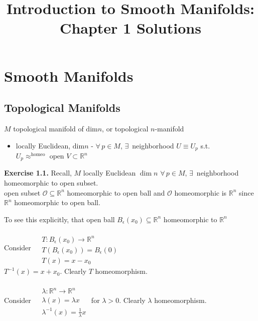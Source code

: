 \documentclass[11pt]{amsart}
\title{Introduction to Smooth Manifolds: Chapter 1 Solutions}
\theoremstyle{definition}
\newcommand{\exercisehead}[1]{\medskip\noindent\textbf{Exercise #1.} }
\begin{document}
\maketitle
\section{Smooth Manifolds}







\subsection*{Topological Manifolds }

$M$ topological manifold of $\text{dim}{n}$, or topological $n$-manifold
\begin{itemize}
\item locally Euclidean, $\text{dim}{n}$ - $\forall \, p \in M$, $\exists \, $ neighborhood $U \equiv U_p$ s.t. $U_p \approx^{\text{homeo}} \text{ open } V \subset \mathbb{R}^n$
\end{itemize}


\exercisehead{1.1} Recall, $M$ locally Euclidean $\dim{n}$ $\forall \, p \in M$, $\exists \,$ neighborhood homeomorphic to open subset. \\
open subset $\mathcal{O} \subseteq \mathbb{R}^n$ homeomorphic to open ball and $\mathcal{O}$ homeomorphic is $\mathbb{R}^n$ since $\mathbb{R}^n$ homeomorphic to open ball.

To see this explicitly, that open ball $B_{\epsilon}(x_0) \subseteq \mathbb{R}^n $ homeomorphic to $\mathbb{R}^n$

Consider $\begin{aligned} & \quad \\
  & T: B_{\epsilon}(x_0) \to \mathbb{R}^n \\
  & T(B_{\epsilon}(x_0)) = B_{\epsilon}(0) \\
  & T(x) = x- x_0 \end{aligned}$  \\
$T^{-1}(x) = x+x_0$.  Clearly $T$ homeomorphism.

Consider $\begin{aligned} & \quad \\
& \lambda : \mathbb{R}^n \to \mathbb{R}^n \\
  & \lambda(x) = \lambda x \\
  & \lambda^{-1}(x) = \frac{1}{ \lambda } x \end{aligned}$ for $\lambda >0$.  Clearly $\lambda$ homeomorphism.
\end{document}
